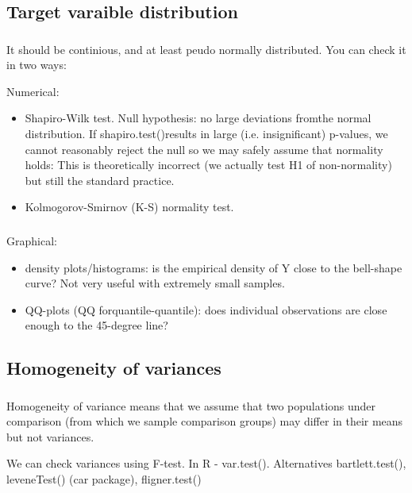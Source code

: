 \documentclass[t, 11pt]{beamer}
\begin{document}
\subsection{Target varaible distribution}
	\begin{frame}
	\frametitle{\insertsection} 
	\framesubtitle{\insertsubsection} 
	
	It should be continious, and at least peudo normally distributed. You can check it in two ways:
	
	Numerical:
		\begin{itemize}
		\item Shapiro-Wilk test. Null hypothesis: no large deviations fromthe normal distribution. If shapiro.test()results in large (i.e. insignificant) p-values, we cannot reasonably reject the null so we may safely assume that normality holds: This is theoretically incorrect (we actually test H1 of non-normality) but still the standard practice.
		\item  Kolmogorov-Smirnov (K-S) normality test. 
		\end{itemize}
	\end{frame}
	\begin{frame}
	\frametitle{\insertsection} 
	\framesubtitle{\insertsubsection} 
	Graphical:
	\begin{itemize}
		\item density plots/histograms: is the empirical density of Y close to the bell-shape curve? Not very useful with extremely small samples.
		\item QQ-plots (QQ forquantile-quantile): does individual observations are close enough to the 45-degree line?
	\end{itemize}

	
	\end{frame}	

	 \subsection{Homogeneity of variances}
	
	\begin{frame}
		\frametitle{\insertsection} 
		\framesubtitle{\insertsubsection} 
		
	Homogeneity of variance means that we assume that two populations under comparison (from which we sample comparison groups) may differ in their means but not variances.
	
	\vspace{1cm}
	
	We can check variances using F-test. In R - var.test(). Alternatives bartlett.test(), leveneTest() (car package), fligner.test()
	
	\end{frame}	
\end{document}
